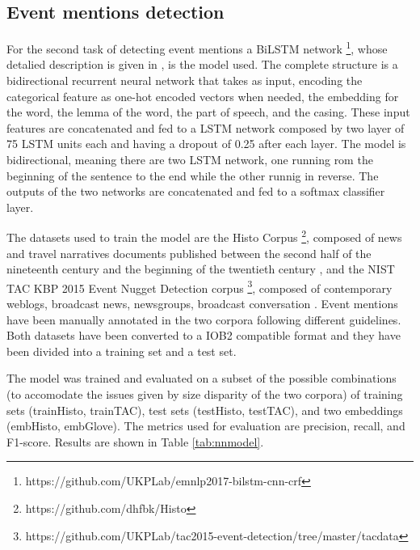 \documentclass[runningheads]{llncs}
\begin{document}
\subsection{Event mentions detection}
For the second task of detecting event mentions a BiLSTM network \footnote{https://github.com/UKPLab/emnlp2017-bilstm-cnn-crf}, whose detalied description is given in \cite{bilstm}, is the model used. The complete structure is a bidirectional recurrent neural network that takes as input, encoding the categorical feature as one-hot encoded vectors when needed, the embedding for the word, the lemma of the word, the part of speech, and the casing. These input features are concatenated and fed to a LSTM network composed by two layer of 75 LSTM units each and having a dropout of 0.25 after each layer. The model is bidirectional, meaning there are two LSTM network, one running rom the beginning of the sentence to the end while the other runnig in reverse. The outputs of the two networks are concatenated and fed to a softmax classifier layer.

The datasets used to train the model are the Histo Corpus \footnote{https://github.com/dhfbk/Histo}, composed of news and travel narratives documents published between the second half of the nineteenth century and the beginning of the twentieth century \cite{histo}, and the NIST TAC KBP 2015 Event Nugget Detection corpus \footnote{https://github.com/UKPLab/tac2015-event-detection/tree/master/tacdata}, composed of contemporary weblogs, broadcast news, newsgroups, broadcast conversation \cite{tac}. Event mentions have been manually annotated in the two corpora following different guidelines. Both datasets have been converted to a IOB2 compatible format and they have been divided into a training set and a test set.

The model was trained and evaluated on a subset of the possible combinations (to accomodate the issues given by size disparity of the two corpora) of training sets (trainHisto, trainTAC), test sets (testHisto, testTAC), and two embeddings (embHisto, embGlove). The metrics used for evaluation are precision, recall, and F1-score. Results are shown in Table \ref{tab:nnmodel}. 
\end{document}
